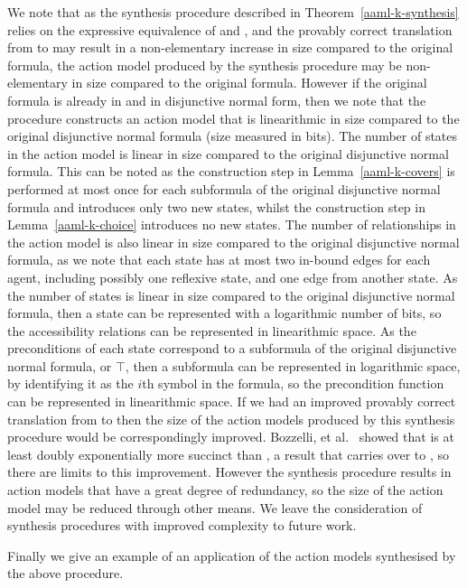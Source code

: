 We note that as the synthesis procedure described in Theorem~\ref{aaml-k-synthesis} relies on the expressive equivalence of \logicRamlK{} and \logicK{}, and the provably correct translation from \langAaml{} to \langMl{} may result in a non-elementary increase in size compared to the original formula, the action model produced by the synthesis procedure may be non-elementary in size compared to the original formula.
However if the original formula is already in \langMl{} and in disjunctive normal form, then we note that the procedure constructs an action model that is linearithmic in size compared to the original disjunctive normal formula (size measured in bits).
The number of states in the action model is linear in size compared to the original disjunctive normal formula.
This can be noted as the construction step in Lemma~\ref{aaml-k-covers} is performed at most once for each subformula of the original disjunctive normal formula and introduces only two new states, whilst the construction step in Lemma~\ref{aaml-k-choice} introduces no new states.
The number of relationships in the action model is also linear in size compared to the original disjunctive normal formula, as we note that each state has at most two in-bound edges for each agent, including possibly one reflexive state, and one edge from another state.
As the number of states is linear in size compared to the original disjunctive normal formula, then a state can be represented with a logarithmic number of bits, so the accessibility relations can be represented in linearithmic space.
As the preconditions of each state correspond to a subformula of the original disjunctive normal formula, or $\top$, then a subformula can be represented in logarithmic space, by identifying it as the $i$th symbol in the formula, so the precondition function can be represented in linearithmic space.
If we had an improved provably correct translation from \langAaml{} to \langMl{} then the size of the action models produced by this synthesis procedure would be correspondingly improved.
Bozzelli, et al.~\cite{bozzelli:2014a} showed that \logicRmlK{} is at least doubly exponentially more succinct than \logicK{}, a result that carries over to \logicAamlK{}, so there are limits to this improvement.
However the synthesis procedure results in action models that have a great degree of redundancy, so the size of the action model may be reduced through other means.
We leave the consideration of synthesis procedures with improved complexity to future work.

Finally we give an example of an application of the action models synthesised by the above procedure.

